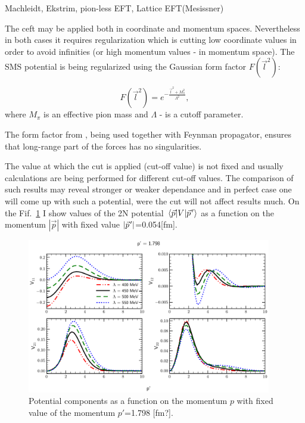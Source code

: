 {\color{red} Machleidt, Ekstrim, pion-less EFT, Lattice EFT(Mesissner)}


The \gls*{ceft} may be applied both in coordinate and momentum spaces.
Nevertheless in both cases it requires regularization which is cutting 
low coordinate values in order to avoid infinities 
(or high momentum values - in momentum space). 
The SMS potential is being regularized using the Gaussian form factor
$F(\vec{l}^2)$:

\begin{equation}
    F(\vec{l}^2) = e^{-\frac{\vec{l}^2 + M_\pi^2}{\Lambda^2}},
    \label{regulator}
\end{equation}
where $M_\pi$ is an effective pion mass and $\Lambda$ - is a cutoff parameter.

The form factor from , being used together with Feynman propagator,
ensures that long-range part of the forces has no singularities. 

The value at which
the cut is applied (cut-off value) is not fixed and usually calculations
are being performed for different cut-off values. The comparison
of such results may reveal stronger or weaker dependance and in perfect
case one will come up with such a potential, were the cut will
not affect results much. On the Fif.~\ref{potential_cutoff} 
I show values of the 2N potential $\matrixel{\vec{p}}{V}{\pvec{p}}$
as a function on the momentum $|\vec{p}|$ with fixed value $|\pvec{p}|$=0.054[fm].



\begin{figure}[htb]
    \begin{center}
    \includegraphics[width=0.95\textwidth]{PlotData/Deuteron/WAVEFUNC/potential_pp1.798.pdf}
    \end{center}
    \caption{Potential components as a function on the momentum $p$ with fixed
    value of the momentum $p'$=1.798 [fm?].
    }
    \label{potential_cutoff}
\end{figure}



